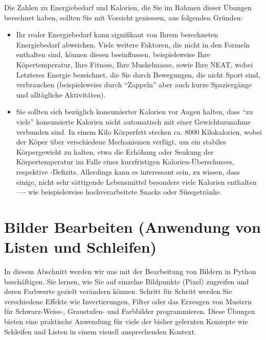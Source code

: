 \begin{mycaution}
	Die Zahlen zu Energiebedarf und Kalorien, die Sie im Rahmen dieser Übungen berechnet haben, sollten Sie mit Vorsicht geniessen, aus folgenden Gründen:
	\begin{itemize}
		\item Ihr realer Energiebedarf kann signifikant von Ihrem berechneten Energiebedarf abweichen. Viele weitere Faktoren, die nicht in den Formeln enthalten sind, können diesen beeinflussen, beispielsweise Ihre Köpertemperatur, Ihre Fitness, Ihre Muskelmasse, sowie Ihre \gls{NEAT}, wobei Letzteres Energie bezeichnet, die Sie durch Bewegungen, die nicht Sport sind, verbrauchen (beispielsweise durch \enquote{Zappeln} aber auch kurze Spaziergänge und alltägliche Aktivitäten).
		\item Sie sollten sich bezüglich konsumierter Kalorien vor Augen halten, dass \enquote{zu viele} konsumierte Kalorien nicht automatisch mit einer Gewichtszunahme verbunden sind. In einem Kilo Körperfett stecken ca. 8000 Kilokalorien, wobei der Köper über verschiedene Mechanismen verfügt, um ein stabiles Körpergewicht zu halten, etwa die Erhöhung oder Senkung der Körpertemperatur im Falle eines kurzfristigen Kalorien-Überschusses, respektive -Defizits. Allerdings kann es interessant sein, zu wissen, dass einige, nicht sehr sättigende Lebensmittel besonders viele Kalorien enthalten ––- wie beispielsweise hochverarbeitete Snacks oder Süssgetränke.
	\end{itemize}
\end{mycaution}


\clearpage
\section{Bilder Bearbeiten (Anwendung von Listen und Schleifen)}
In diesem Abschnitt werden wir uns mit der Bearbeitung von Bildern in Python beschäftigen.
Sie lernen, wie Sie auf einzelne Bildpunkte (Pixel) zugreifen und deren Farbwerte gezielt verändern können.
Schritt für Schritt werden Sie verschiedene Effekte wie Invertierungen, Filter oder das Erzeugen von Mustern für Schwarz-Weiss-, Graustufen- und Farbbilder programmieren.
Diese Übungen bieten eine praktische Anwendung für viele der bisher gelernten Konzepte wie Schleifen und Listen in einem visuell ansprechenden Kontext.

